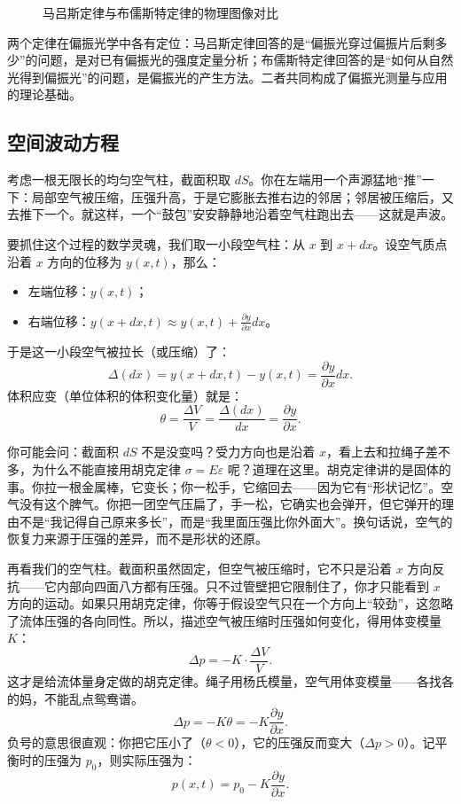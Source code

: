 \documentclass[UTF8]{ctexbook}
\begin{document}
\begin{figure}[htbp]
\centering
\caption{马吕斯定律与布儒斯特定律的物理图像对比}
\label{fig:polarization_comparison}
\end{figure}

两个定律在偏振光学中各有定位：马吕斯定律回答的是“偏振光穿过偏振片后剩多少”的问题，是对已有偏振光的强度定量分析；布儒斯特定律回答的是“如何从自然光得到偏振光”的问题，是偏振光的产生方法。二者共同构成了偏振光测量与应用的理论基础。

\subsection{空间波动方程}

考虑一根无限长的均匀空气柱，截面积取 $dS$。你在左端用一个声源猛地“推”一下：局部空气被压缩，压强升高，于是它膨胀去推右边的邻居；邻居被压缩后，又去推下一个。就这样，一个“鼓包”安安静静地沿着空气柱跑出去——这就是声波。

要抓住这个过程的数学灵魂，我们取一小段空气柱：从 $x$ 到 $x+dx$。设空气质点沿着 $x$ 方向的位移为 $y(x,t)$，那么：
\begin{itemize}
    \item 左端位移：$y(x,t)$；
    \item 右端位移：$y(x+dx,t) \approx y(x,t) + \frac{\partial y}{\partial x} dx$。
\end{itemize}

于是这一小段空气被拉长（或压缩）了：
\[
\Delta(dx) =y(x+dx,t)-y(x,t)= \frac{\partial y}{\partial x} dx.
\]
体积应变（单位体积的体积变化量）就是：
\[
\theta = \frac{\Delta V}{V} = \frac{\Delta(dx)}{dx} = \frac{\partial y}{\partial x}.
\]

你可能会问：截面积 $dS$ 不是没变吗？受力方向也是沿着 $x$，看上去和拉绳子差不多，为什么不能直接用胡克定律 $\sigma = E \varepsilon$ 呢？道理在这里。胡克定律讲的是固体的事。你拉一根金属棒，它变长；你一松手，它缩回去——因为它有“形状记忆”。空气没有这个脾气。你把一团空气压扁了，手一松，它确实也会弹开，但它弹开的理由不是“我记得自己原来多长”，而是“我里面压强比你外面大”。换句话说，空气的恢复力来源于压强的差异，而不是形状的还原。

再看我们的空气柱。截面积虽然固定，但空气被压缩时，它不只是沿着 $x$ 方向反抗——它内部向四面八方都有压强。只不过管壁把它限制住了，你才只能看到 $x$ 方向的运动。如果只用胡克定律，你等于假设空气只在一个方向上“较劲”，这忽略了流体压强的各向同性。所以，描述空气被压缩时压强如何变化，得用体变模量 $K$：
\[
\Delta p = -K \cdot \frac{\Delta V}{V}.
\]
这才是给流体量身定做的胡克定律。绳子用杨氏模量，空气用体变模量——各找各的妈，不能乱点鸳鸯谱。
\[
\Delta p = -K \theta = -K \frac{\partial y}{\partial x}.
\]
负号的意思很直观：你把它压小了（$\theta<0$），它的压强反而变大（$\Delta p>0$）。记平衡时的压强为 $p_0$，则实际压强为：
\[
p(x,t) = p_0 - K \frac{\partial y}{\partial x}.
\]
\end{document}
